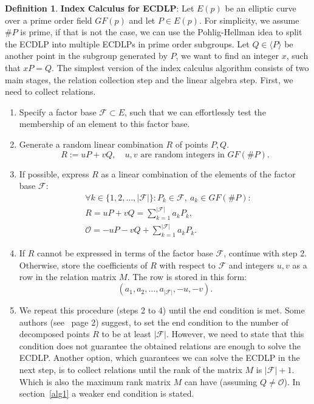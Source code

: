 \documentclass[thesis=M,english]{FITthesis}[2012/10/20]
\theoremstyle{remark}
\theoremstyle{definition}
\newtheorem{DF}{Definition}[section]
\begin{document}
\begin{DF}
\textbf{Index Calculus for ECDLP}: Let $E(p)$ be an elliptic curve over a prime order field $GF(p)$ and  let $P \in E(p)$. For simplicity, we assume $\#P$ is prime, if that is not the case, we can use the Pohlig-Hellman idea to split the ECDLP into multiple ECDLPs in prime order subgroups. Let $Q \in \langle P \rangle$ be another point in the subgroup generated by $P$, we want to find an integer $x$, such that $xP = Q$. The simplest version of the index calculus algorithm consists of two main stages, the relation collection step and the linear algebra step. First, we need to collect relations.
\begin{enumerate}
\item Specify a factor base $\mathcal{F} \subset E$, such that we can effortlessly test the membership of an element to this factor base. 
\item Generate a random linear combination $R$ of points $P,Q$.
$$
R := uP + vQ,\quad \text{$u,v$ are random integers in $GF(\#P)$}.
$$
\item If possible, express $R$ as a linear combination of the elements of the factor base $\mathcal{F}$:
\begin{align*}
&\forall k \in \{1,2,\ldots,|\mathcal{F}|\}: P_k \in \mathcal{F},\ a_k \in GF(\#P): \\
&R = uP + vQ = \sum_{k=1}^{|\mathcal{F}|}a_k P_k, \\
&\mathcal{O} = -uP - vQ + \sum_{k=1}^{|\mathcal{F}|}a_k P_k.
\end{align*}
\item If $R$ cannot be expressed in terms of the factor base $\mathcal{F}$, continue with step 2. Otherwise, store the coefficients of $R$ with respect to $\mathcal{F}$ and integers $u,v$ as a row in the relation matrix $M$. The row is stored in this form:
$$
(a_1, a_2, \ldots, a_{|\mathcal{F}|}, -u, -v).
$$
\item We repeat this procedure (steps 2 to 4) until the end condition is met.
\noindent Some authors (see~\cite{amadori17} page 2) suggest, to set the end condition to the number of decomposed points $R$ to be at least $|\mathcal{F}|$. However, we need to state that this condition does not guarantee the obtained relations are enough to solve the ECDLP. Another option, which guarantees we can solve the ECDLP in the next step, is to collect relations until the rank of the matrix $M$ is $|\mathcal{F}| + 1$. Which is also the maximum rank matrix $M$ can have (assuming $Q \neq \mathcal{O}$).  In section~\ref{alg1} a weaker end condition is stated.

\end{enumerate}
\end{DF}
\end{document}
